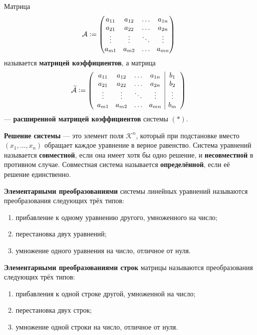 \begin{definition}
    Матрица
    $$
    \mathcal{A} \vcentcolon = 
    \begin{pmatrix}
        a_{11} & a_{12} & \ldots & a_{1n}\\
        a_{21} & a_{22} & \ldots & a_{2n}\\
        \vdots & \vdots & \ddots & \vdots\\
        a_{m1} & a_{m2} & \ldots & a_{mn}\\
    \end{pmatrix}
    $$
    называется \textbf{матрицей коэффициентов}, а матрица 
    $$
    \widetilde{\mathcal{A}} \vcentcolon =
    \left(
    \begin{array}{cccc | c}
        a_{11} & a_{12} & \ldots & a_{1n} & b_1\\
        a_{21} & a_{22} & \ldots & a_{2n} & b_2\\
        \vdots & \vdots & \ddots & \vdots & \vdots\\
        a_{m1} & a_{m2} & \ldots & a_{mn} & b_m\\
    \end{array}
    \right)
    $$
    --- \textbf{расширенной матрицей коэффициентов} системы $(\ast)$.
\end{definition}

\begin{definition}
    \textbf{Решение системы} --- это элемент поля $\mathcal{K}^n$, который при подстановке вместо $(x_1, \ldots, x_n)$ обращает каждое уравнение в верное равенство. Система уравнений называется \textbf{совместной}, если она имеет хотя бы одно решение, и \textbf{несовместной} в противном случае. Совместная система называется \textbf{определённой}, если её решение единственно.
\end{definition}

\begin{definition}
    \textbf{Элементарными преобразованиями} системы линейных уравнений называются преобразования следующих трёх типов:
    \begin{enumerate}[noitemsep]
        \item прибавление к одному уравнению другого, умноженного на число;
        \item перестановка двух уравнений;
        \item умножение одного уравнения на число, отличное от нуля.
    \end{enumerate}

    \textbf{Элементарными преобразованиями строк} матрицы называются преобразования следующих трёх типов:
    \begin{enumerate}[noitemsep]
        \item прибавления к одной строке другой, умноженной на число;
        \item перестановка двух строк;
        \item умножение одной строки на число, отличное от нуля.
    \end{enumerate}
\end{definition}

